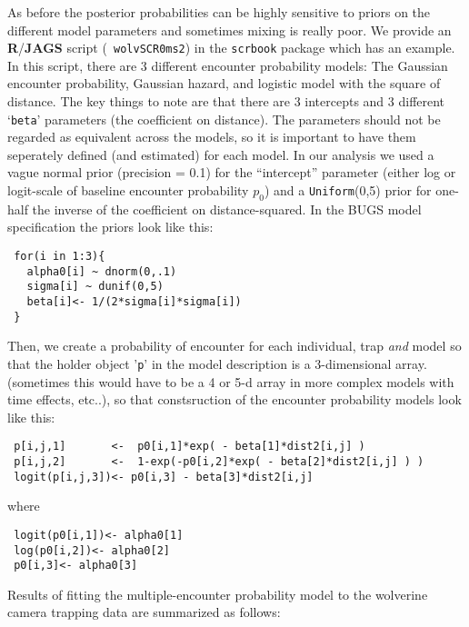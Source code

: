 As before the posterior probabilities can be highly sensitive to
priors on the different model parameters and sometimes mixing is
really poor.  We provide an {\bf R}/{\bf JAGS} script (\mbox{\tt
  wolvSCR0ms2}) in the \mbox{\tt scrbook} package which has an
example.  In this script, there are 3 different encounter probability
models:
The Gaussian encounter probability, Gaussian hazard, and logistic
model with the square of distance.  The key things to note are that
there are 3 intercepts and 3 different `\mbox{\tt beta}' parameters
(the coefficient on distance). The parameters should not be regarded
as equivalent across the models, so it is important to have them
seperately defined (and estimated) for each model.  In our analysis we
used a vague normal prior (precision = 0.1) for the ``intercept''
parameter (either log or logit-scale of baseline encounter probability
$p_{0}$) and a \mbox{\tt Uniform}(0,5) prior for one-half the inverse of the
coefficient on distance-squared.
In the BUGS model specification the priors look like this:
\begin{verbatim}
 for(i in 1:3){
   alpha0[i] ~ dnorm(0,.1)
   sigma[i] ~ dunif(0,5)
   beta[i]<- 1/(2*sigma[i]*sigma[i])
 }
\end{verbatim}
Then,  we create a probability of encounter for each
individual, trap {\it and} model so that the holder object '\mbox{\tt p}' in the
model description is a 3-dimensional array. (sometimes this would have to be a 4
or 5-d array in more complex models with time effects, etc..), so that
constsruction of the encounter probability models look like this:
\begin{verbatim}
 p[i,j,1]       <-  p0[i,1]*exp( - beta[1]*dist2[i,j] )
 p[i,j,2]       <-  1-exp(-p0[i,2]*exp( - beta[2]*dist2[i,j] ) )
 logit(p[i,j,3])<- p0[i,3] - beta[3]*dist2[i,j]
\end{verbatim}
where
\begin{verbatim}
 logit(p0[i,1])<- alpha0[1]
 log(p0[i,2])<- alpha0[2]
 p0[i,3]<- alpha0[3]
\end{verbatim}
Results of fitting the multiple-encounter probability model to the
wolverine camera trapping data are summarized as follows:

